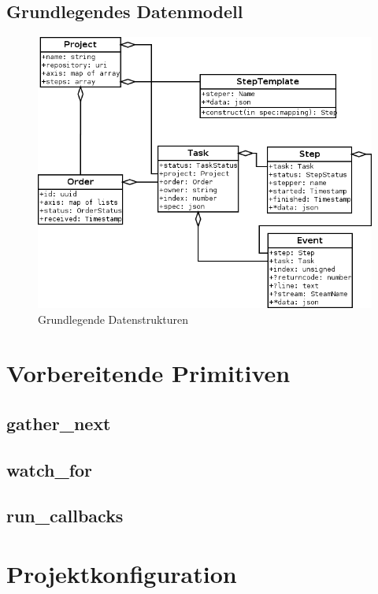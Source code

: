 \subsection{Grundlegendes Datenmodell}


\begin{figure}[ht] 
  \label{fig:datenstrukturen}
  \begin{center}
      \includegraphics[width=\textwidth]{imageinput/datenstrukturen-step-templates.png}
  \end{center}
  \caption{Grundlegende Datenstrukturen}
\end{figure}




\section{Vorbereitende Primitiven}
\subsection{gather\_next}
\subsection{watch\_for}
\subsection{run\_callbacks}

\section{Projektkonfiguration}

